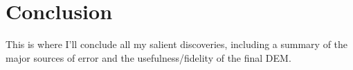 \section{Conclusion}

This is where I'll conclude all my salient discoveries, including a summary of
the major sources of error and the usefulness/fidelity of the final DEM.

